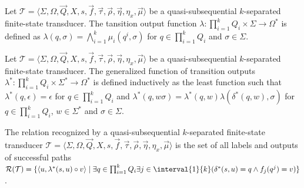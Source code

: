 \begin{definition}
	Let $\mathcal{T} = \langle \Sigma, \Omega, \vec{Q}, X, s, \vec{f},
	\vec{\tau}, \vec{\rho}, \vec{\eta}, \eta_x, \vec{\mu} \rangle$ be a
	quasi-subsequential $k$-separated finite-state transducer. The tansition
	output function $\lambda : \prod_{i=1}^k{Q_i} \times \Sigma \rightarrow
	\Omega^*$ is defined as $\lambda(q, \sigma) = \bigwedge_{i=1}^k \mu_i(q^i,
	\sigma)$ for $q \in \prod_{i=1}^k{Q_i}$ and $\sigma \in \Sigma$.
\end{definition}

\begin{definition}
	Let $\mathcal{T} = \langle \Sigma, \Omega, \vec{Q}, X, s, \vec{f},
	\vec{\tau}, \vec{\rho}, \vec{\eta}, \eta_x, \vec{\mu} \rangle$
	be a quasi-subsequential $k$-separated finite-state transducer. The
	generalized function of transition outputs $\lambda^* : \prod_{i=1}^k{Q_i}
	\times \Sigma^* \rightarrow \Omega^*$ is defined inductively as the least
	function such that $\lambda^*(q, \epsilon) = \epsilon$ for $q \in
	\prod_{i=1}^k{Q_i}$ and $\lambda^*(q, w\sigma) = \lambda^*(q, w)\lambda
	(\delta^*(q, w), \sigma)$ for $q \in \prod_{i=1}^k{Q_i}$, $w \in \Sigma^*$
	and $\sigma \in \Sigma$.
\end{definition}

\begin{definition}
	The relation recognized by a quasi-subsequential $k$-separated finite-state
	transducer $\mathcal{T} = \langle \Sigma, \Omega, \vec{Q}, X, s, \vec{f},
	\vec{\tau}, \vec{\rho}, \vec{\eta}, \eta_x, \vec{\mu} \rangle$ is the set
	of all labels and outputs of successful paths $\mathcal{R}(\mathcal{T}) = \{
	\langle u, \lambda^*(s, u) \circ v \rangle \mid \exists q \in
	\prod_{i=1}^k{Q_i} \exists j \in \interval{1}{k}(\delta^*(s, u) = q \land
	f_j(q^j) = v) \}$.
\end{definition}

